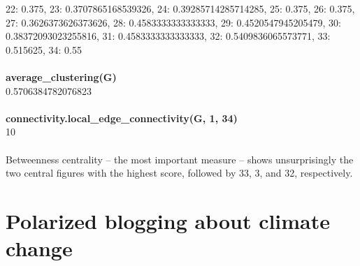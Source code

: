 \documentclass[11pt]{article}
\begin{document}
22: 0.375, 23: 0.3707865168539326, 24: 0.39285714285714285, 25: 0.375,
26: 0.375, 27: 0.3626373626373626, 28: 0.4583333333333333, 29: 0.4520547945205479,
30: 0.38372093023255816, 31: 0.4583333333333333, 32: 0.5409836065573771, 33: 0.515625, 34: 0.55
\\\\
\textbf{average\_clustering(G)}\\
0.5706384782076823
\\\\
\textbf{connectivity.local\_edge\_connectivity(G, 1, 34)}\\
10\\
\\
Betweenness centrality -- the most important measure -- shows unsurprisingly the two
central figures with the highest score, followed by 33, 3, and 32, respectively.

\section{Polarized blogging about climate change}
\end{document}
